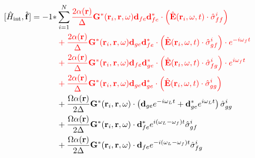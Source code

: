 \documentclass[a4paper, 11pt]{article}
\numberwithin{equation}{section}
\begin{document}
\begin{equation}
\begin{aligned}
  [\hat{H}_\text{int},\hat{\mathbf{f}}] = -1* &\sum_{i=1}^N
  \color{red}
  \frac{2\alpha(\mathbf{r})}{\Delta}\mathbf{G}^*(\mathbf{r}_i, \mathbf{r}, \omega)
  \mathbf{d}_{fe}\mathbf{d}_{fe}^* \cdot \left(\hat{\mathbf{E}}(\mathbf{r}_i,\omega,t)
\cdot \hat{\sigma}_{ff}^i\right)\\ &\color{red}+
  \frac{2\alpha(\mathbf{r})}{\Delta}\mathbf{G}^*(\mathbf{r}_i, \mathbf{r}, \omega)
  \mathbf{d}_{ge}\mathbf{d}_{fe}^* \cdot \left( \hat{\mathbf{E}}(\mathbf{r}_i, \omega,
t) \cdot \hat{\sigma}_{gf}^i \right) \cdot e^{-i\omega_f t}\\&\color{red}+
  \frac{2\alpha(\mathbf{r})}{\Delta}\mathbf{G}^*(\mathbf{r}_i, \mathbf{r}, \omega)
  \mathbf{d}_{fe}\mathbf{d}_{ge}^* \cdot \left( \hat{\mathbf{E}}(\mathbf{r}_i, \omega,
t) \cdot \hat{\sigma}_{fg}^i \right)\cdot e^{i\omega_ft}\\ &\color{red}+ \frac{2\alpha(\mathbf{r})}{\Delta}
  \mathbf{G}^*(\mathbf{r}_i, \mathbf{r}, \omega) \mathbf{d}_{ge}\mathbf{d}_{ge}^*
  \cdot \left(\hat{\mathbf{E}}(\mathbf{r}_i,\omega,t) \cdot \hat{\sigma}_{gg}^i
  \right)\\ &+ \frac{\Omega\alpha(\mathbf{r})}{2\Delta} \mathbf{G}^*(\mathbf{r}_i,
  \mathbf{r}, \omega)\cdot \left(\mathbf{d}_{ge}e^{-i\omega_Lt} +
  \mathbf{d}_{ge}^*e^{i\omega_Lt}\right) \hat{\sigma}_{gg}^i \\ &+
  \frac{\Omega\alpha(\mathbf{r})}{2\Delta} \mathbf{G}^*(\mathbf{r}_i, \mathbf{r},
  \omega)\cdot \mathbf{d}_{fe}^*e^{i(\omega_L-\omega_f)t}\hat{\sigma}_{gf}^i\\ &+
  \frac{\Omega\alpha(\mathbf{r})}{2\Delta} \mathbf{G}^*(\mathbf{r}_i, \mathbf{r},
  \omega)\cdot \mathbf{d}_{fe}e^{-i(\omega_L-\omega_f)t}\hat{\sigma}_{fg}^i
\end{aligned}
\end{equation}
\end{document}
